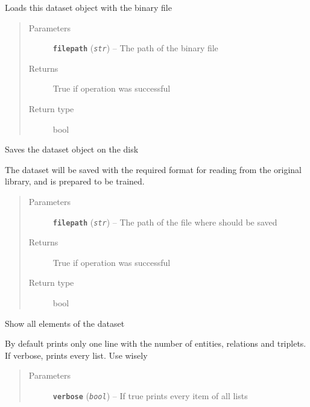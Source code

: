 \documentclass[letterpaper,10pt,english]{sphinxmanual}
\begin{document}
\begin{fulllineitems}
\begin{fulllineitems}
Loads this dataset object with the binary file
\begin{quote}\begin{description}
\item[{Parameters}] \leavevmode
\textbf{\texttt{filepath}} (\emph{\texttt{str}}) -- The path of the binary file

\item[{Returns}] \leavevmode
True if operation was successful

\item[{Return type}] \leavevmode
bool

\end{description}\end{quote}

\end{fulllineitems}


\begin{fulllineitems}
\label{index:dataset.Dataset.save_to_binary}
Saves the dataset object on the disk

The dataset will be saved with the required format for reading
from the original library, and is prepared to be trained.
\begin{quote}\begin{description}
\item[{Parameters}] \leavevmode
\textbf{\texttt{filepath}} (\emph{\texttt{str}}) -- The path of the file where should be saved

\item[{Returns}] \leavevmode
True if operation was successful

\item[{Return type}] \leavevmode
bool

\end{description}\end{quote}

\end{fulllineitems}


\begin{fulllineitems}
\label{index:dataset.Dataset.show}
Show all elements of the dataset

By default prints only one line with the number of entities, relations
and triplets. If verbose, prints every list. Use wisely
\begin{quote}\begin{description}
\item[{Parameters}] \leavevmode
\textbf{\texttt{verbose}} (\emph{\texttt{bool}}) -- If true prints every item of all lists


\end{description}
\end{quote}
\end{fulllineitems}
\end{fulllineitems}
\end{document}
